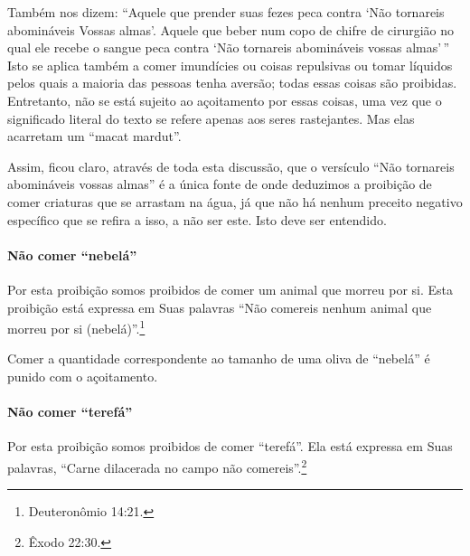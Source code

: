 Também nos dizem: ``Aquele que prender suas fezes peca contra `Não
tornareis abomináveis Vossas almas'. Aquele que beber num copo de chifre
de cirurgião no qual ele recebe o sangue peca contra `Não tornareis
abomináveis vossas almas'\,'' Isto se aplica também a comer imundícies ou
coisas repulsivas ou tomar líquidos pelos quais a maioria das pessoas
tenha aversão; todas essas coisas são proibidas. Entretanto, não se está
sujeito ao açoitamento por essas coisas, uma vez que o significado
literal do texto se refere apenas aos seres rastejantes. Mas elas
acarretam um ``macat mardut''.

Assim, ficou claro, através de toda esta discussão, que o versículo
``Não tornareis abomináveis vossas almas'' é a única fonte de onde
deduzimos a proibição de comer criaturas que se arrastam na água, já que
não há nenhum preceito negativo específico que se refira a isso, a não
ser este. Isto deve ser entendido.

\paragraph{Não comer ``nebelá''}

Por esta proibição somos proibidos de comer um animal que morreu por
si. Esta proibição está expressa em Suas palavras ``Não comereis nenhum
animal que morreu por si (nebelá)''.\footnote{Deuteronômio 14:21.}

Comer a quantidade correspondente ao tamanho de uma oliva de ``nebelá''
é punido com o açoitamento.

\paragraph{Não comer ``terefá''}

Por esta proibição somos proibidos de comer ``terefá''. Ela está
expressa em Suas palavras, ``Carne dilacerada no campo não comereis''.\footnote{Êxodo 22:30.}

